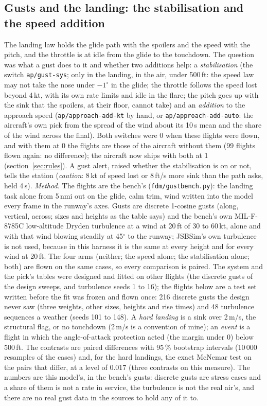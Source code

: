 \documentclass[10pt,a4paper,twocolumn]{article}
\begin{document}
\subsection{Gusts and the landing: the stabilisation and the speed addition}\label{sec:gusts}
The landing law holds the glide path with the spoilers and the speed with the pitch, and the throttle is at idle from the glide to the touchdown. The question was what a gust does
to it and whether two additions help: a \emph{stabilisation} (the switch \texttt{ap/gust-sys}; only in the landing, in the air, under 500\,ft: the speed law may not take the nose under
$-1^\circ$ in the glide; the throttle follows the speed lost beyond 4\,kt, with its own rate limits and idle in the flare; the pitch goes up with the sink that the spoilers, at their
floor, cannot take) and an \emph{addition} to the approach speed (\texttt{ap/approach-add-kt} by hand, or \texttt{ap/approach-add-auto}: the aircraft's own pick from the spread of the wind about its
10\,s mean and the share of the wind across the final). Both switches were 0 when these flights were flown, and with them at 0 the flights are those of the aircraft without them (99 flights flown
again: no difference); the aircraft now ships with both at 1 (section~\ref{sec:rules}). A gust alert, raised whether the stabilisation is on or not, tells the station (\emph{caution}: 8\,kt of speed lost or 8\,ft/s more sink than the path asks, held 4\,s).
\emph{Method.} The flights are the bench's (\texttt{fdm/gustbench.py}): the landing task alone from 5\,nmi out on the glide, calm trim, wind written into the model every frame in the runway's axes. Gusts
are discrete 1-cosine gusts (along, vertical, across; sizes and heights as the table says) and the bench's own MIL-F-8785C low-altitude Dryden turbulence at a wind at 20\,ft of 30 to 60\,kt, alone and
with that wind blowing steadily at 45$^\circ$ to the runway; JSBSim's own turbulence is not used, because in this harness it is the same at every height and for every wind at 20\,ft. The four arms (neither;
the speed alone; the stabilisation alone; both) are flown on the same cases, so every comparison is paired. The system and the pick's tables were designed and fitted on other flights (the discrete gusts of
the design sweeps, and turbulence seeds 1 to 16); the flights below are a test set written before the fit was frozen and flown once: 216 discrete gusts the design never saw (three weights, other sizes, heights and
rise times) and 48 turbulence sequences a weather (seeds 101 to 148). A \emph{hard landing} is a sink over 2\,m/s, the structural flag, or no touchdown (2\,m/s is a convention of mine); an \emph{event} is a flight
in which the angle-of-attack protection acted (the margin under 0) below 500\,ft. The contrasts are paired differences with 95\,\% bootstrap intervals (10\,000 resamples of the cases) and, for the hard landings,
the exact McNemar test on the pairs that differ, at a level of 0.017 (three contrasts on this measure). The numbers are this model's, in the bench's gusts: discrete gusts are stress cases and a share of them is not a rate in service,
the turbulence is not the real air's, and there are no real gust data in the sources to hold any of it to.
\end{document}
